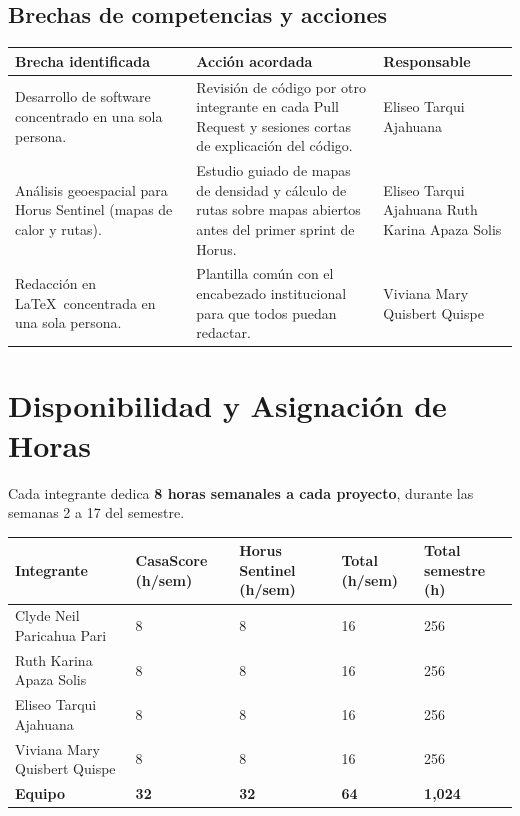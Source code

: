 \documentclass[11pt,a4paper]{article}
\begin{document}
\subsection{Brechas de competencias y acciones}
{\small
\noindent\begin{tabularx}{\textwidth}{@{}P{4.2cm} L P{2.8cm}@{}}
\toprule
{}
\textbf{Brecha identificada} & \textbf{Acción acordada} & \textbf{Responsable} \\
\midrule
Desarrollo de software concentrado en una sola persona. & Revisión de código por otro integrante en cada Pull Request y sesiones cortas de explicación del código. & Eliseo Tarqui Ajahuana \\
Análisis geoespacial para Horus Sentinel (mapas de calor y rutas). & Estudio guiado de mapas de densidad y cálculo de rutas sobre mapas abiertos antes del primer sprint de Horus. & Eliseo Tarqui Ajahuana \newline Ruth Karina Apaza Solis \\
Redacción en \LaTeX\ concentrada en una sola persona. & Plantilla común con el encabezado institucional para que todos puedan redactar. & Viviana Mary Quisbert Quispe \\
\bottomrule
\end{tabularx}
}

\section{Disponibilidad y Asignación de Horas}
Cada integrante dedica \textbf{8 horas semanales a cada proyecto}, durante las semanas 2 a 17 del semestre.

\vspace{0.1cm}
{\small
\noindent\begin{tabularx}{\textwidth}{@{}L C{2.2cm} C{2.2cm} C{2.2cm} C{2.6cm}@{}}
\toprule
{}
\textbf{Integrante} & \textbf{CasaScore (h/sem)} & \textbf{Horus Sentinel (h/sem)} & \textbf{Total (h/sem)} & \textbf{Total semestre (h)} \\
\midrule
Clyde Neil Paricahua Pari & 8 & 8 & 16 & 256 \\
Ruth Karina Apaza Solis & 8 & 8 & 16 & 256 \\
Eliseo Tarqui Ajahuana & 8 & 8 & 16 & 256 \\
Viviana Mary Quisbert Quispe & 8 & 8 & 16 & 256 \\
\midrule
\textbf{Equipo} & \textbf{32} & \textbf{32} & \textbf{64} & \textbf{1,024} \\
\bottomrule
\end{tabularx}
}
\end{document}
